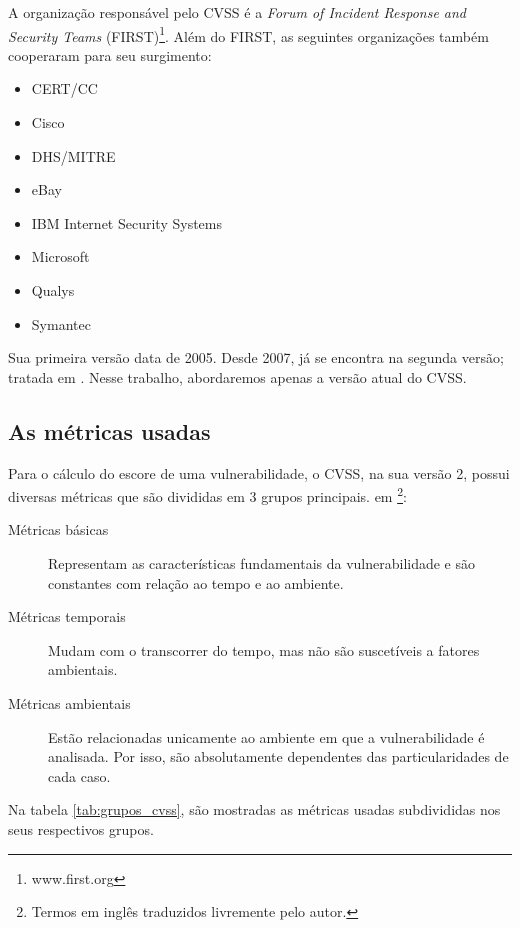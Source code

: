 			
			A organização responsável pelo CVSS é a 
			\textsl{Forum of Incident Response and Security Teams} (FIRST)\footnote{www.first.org}.
			Além do FIRST, as seguintes organizações também cooperaram para seu surgimento:
			\begin{itemize}	
				\item{CERT/CC}
				\item{Cisco}
				\item{DHS/MITRE}
				\item{eBay}
				\item{IBM Internet Security Systems}
				\item{Microsoft}
				\item{Qualys}
				\item{Symantec}
			\end{itemize}	
			Sua primeira versão data de 2005. Desde 2007, já se encontra na segunda versão;
			tratada em \cite{Mell2007}. Nesse trabalho, abordaremos	apenas a versão atual do CVSS.

		\subsection{As métricas usadas}
		\label{subsec:metricas_cvss}
			Para o cálculo do escore de uma vulnerabilidade, o CVSS, na sua versão 2, possui diversas métricas
			que são divididas em 3 grupos principais. 
			em \cite{Mell2007}\footnote{Termos em inglês traduzidos livremente pelo autor.}:
			\begin{description}
				\item[Métricas básicas]{Representam as características fundamentais da vulnerabilidade
				e são constantes com relação ao tempo e ao ambiente.}
				\item[Métricas temporais]{Mudam com o transcorrer do tempo, mas não são suscetíveis
				a fatores ambientais.}
				\item[Métricas ambientais]{Estão relacionadas unicamente ao ambiente em que a vulnerabilidade
				é analisada. Por isso, são absolutamente dependentes das particularidades de cada caso.}
			\end{description}	
			Na tabela \ref{tab:grupos_cvss}, são mostradas as métricas usadas subdivididas nos seus respectivos
			grupos. 

